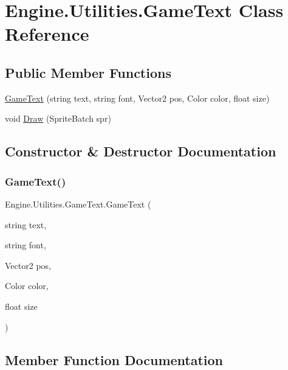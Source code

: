 \hypertarget{a00598}{}\section{Engine.\+Utilities.\+Game\+Text Class Reference}
\label{a00598}
\subsection*{Public Member Functions}
\begin{DoxyCompactItemize}
\item 
\hyperlink{a00598_adcd7d2f1e49ae060840835d804958686}{Game\+Text} (string text, string font, Vector2 pos, Color color, float size)
\item 
void \hyperlink{a00598_aa89cba517208148817587ad1bf6a4855}{Draw} (Sprite\+Batch spr)
\end{DoxyCompactItemize}


\subsection{Constructor \& Destructor Documentation}
\mbox{\label{a00598_adcd7d2f1e49ae060840835d804958686}} 
\subsubsection{\texorpdfstring{Game\+Text()}{GameText()}}
{\footnotesize\ttfamily Engine.\+Utilities.\+Game\+Text.\+Game\+Text (\begin{DoxyParamCaption}\item[{string}]{text,  }\item[{string}]{font,  }\item[{Vector2}]{pos,  }\item[{Color}]{color,  }\item[{float}]{size }\end{DoxyParamCaption})\hspace{0.3cm}{\ttfamily [inline]}}



\subsection{Member Function Documentation}
\mbox{\label{a00598_aa89cba517208148817587ad1bf6a4855}} 
